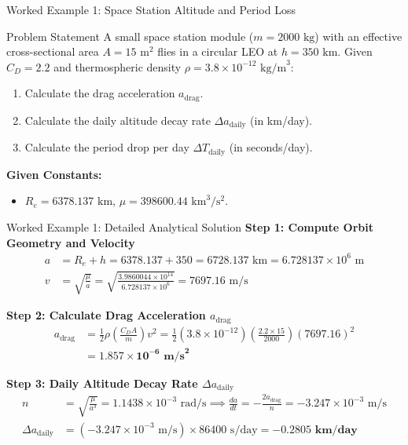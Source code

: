 \documentclass[aspectratio=169,11pt]{beamer}
\begin{document}
\begin{frame}{Worked Example 1: Space Station Altitude and Period Loss}
    \begin{exampleblock}{Problem Statement}
        A small space station module ($m = 2000\text{ kg}$) with an effective cross-sectional area $A = 15\text{ m}^2$ flies in a circular LEO at $h = 350\text{ km}$. Given $C_D = 2.2$ and thermospheric density $\rho = 3.8 \times 10^{-12}\text{ kg/m}^3$:
        \begin{enumerate}
            \item Calculate the drag acceleration $a_{\text{drag}}$.
            \item Calculate the daily altitude decay rate $\Delta a_{\text{daily}}$ (in km/day).
            \item Calculate the period drop per day $\Delta T_{\text{daily}}$ (in seconds/day).
        \end{enumerate}
    \end{exampleblock}

    \textbf{Given Constants:}
    \begin{itemize}
        \item $R_e = 6378.137\text{ km}$, $\mu = 398600.44\text{ km}^3/\text{s}^2$.
    \end{itemize}
\end{frame}

\begin{frame}{Worked Example 1: Detailed Analytical Solution}
    \textbf{Step 1: Compute Orbit Geometry and Velocity}
    \begin{align*}
        a &= R_e + h = 6378.137 + 350 = 6728.137\text{ km} = 6.728137 \times 10^6\text{ m} \\
        v &= \sqrt{\frac{\mu}{a}} = \sqrt{\frac{3.9860044 \times 10^{14}}{6.728137 \times 10^6}} = 7697.16\text{ m/s}
    \end{align*}

    \textbf{Step 2: Calculate Drag Acceleration $a_{\text{drag}}$}
    \begin{align*}
        a_{\text{drag}} &= \frac{1}{2} \rho \left(\frac{C_D A}{m}\right) v^2 = \frac{1}{2} (3.8 \times 10^{-12}) \left(\frac{2.2 \times 15}{2000}\right) (7697.16)^2 \\
        &= \mathbf{1.857 \times 10^{-6}\text{ m/s}^2}
    \end{align*}

    \textbf{Step 3: Daily Altitude Decay Rate $\Delta a_{\text{daily}}$}
    \begin{align*}
        n &= \sqrt{\frac{\mu}{a^3}} = 1.1438 \times 10^{-3}\text{ rad/s} \implies \frac{da}{dt} = -\frac{2 a_{\text{drag}}}{n} = -3.247 \times 10^{-3}\text{ m/s} \\
        \Delta a_{\text{daily}} &= (-3.247 \times 10^{-3}\text{ m/s}) \times 86400\text{ s/day} = \mathbf{-0.2805\text{ km/day}}
    \end{align*}
\end{frame}
\end{document}
